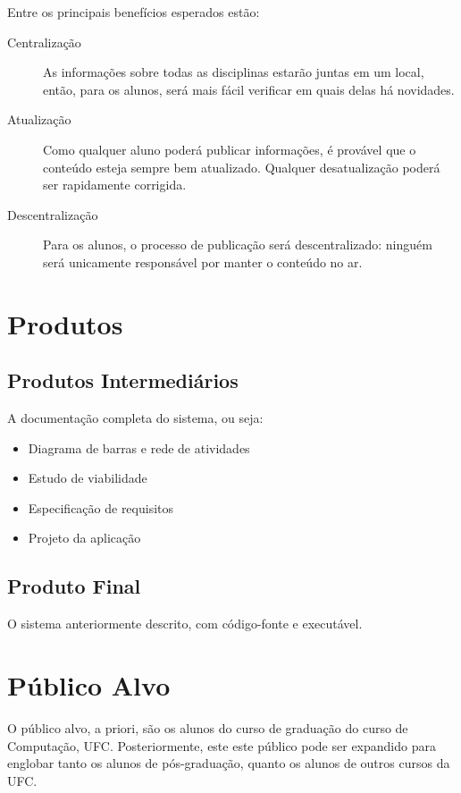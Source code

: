 \documentclass[11pt]{article}
\begin{document}
Entre os principais benefícios esperados estão:

\begin{description}
	\item[Centralização]
     As informações sobre todas as disciplinas estarão juntas em um local, então, para os alunos, será
     mais fácil verificar em quais delas há novidades.
	\item[Atualização]
     Como qualquer aluno poderá publicar informações, é provável que o conteúdo esteja sempre bem
     atualizado. Qualquer desatualização poderá ser rapidamente corrigida.
	\item[Descentralização]
     Para os alunos, o processo de publicação será descentralizado: ninguém será unicamente
     responsável por manter o conteúdo no ar.
\end{description}


\section{Produtos}

\subsection{Produtos Intermediários}

A documentação completa do sistema, ou seja:
\begin{itemize}
	\item Diagrama de barras e rede de atividades
	\item Estudo de viabilidade
	\item Especificação de requisitos
	\item Projeto da aplicação
\end{itemize}

\subsection{Produto Final}

O sistema anteriormente descrito, com código-fonte e executável.



\section{Público Alvo}
O público alvo, a priori, são os alunos do curso de graduação do curso de Computação,
UFC. Posteriormente, este este público pode ser expandido para englobar tanto os
alunos de pós-graduação, quanto os alunos de outros cursos da UFC.
\end{document}
